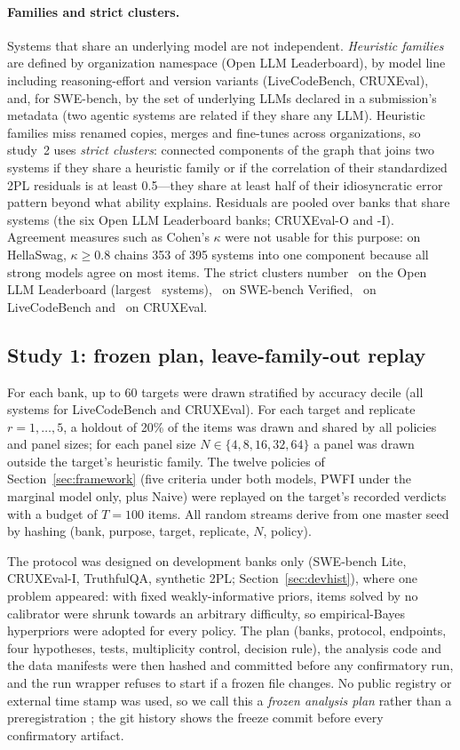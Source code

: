 \paragraph{Families and strict clusters.} Systems that share an underlying model are
not independent. \emph{Heuristic families} are defined by organization namespace (Open
LLM Leaderboard), by model line including reasoning-effort and version variants
(LiveCodeBench, CRUXEval), and, for SWE-bench, by the set of underlying LLMs declared in a
submission's metadata (two agentic systems are related if they share any LLM). Heuristic
families miss renamed copies, merges and fine-tunes across organizations, so study~2 uses
\emph{strict clusters}: connected components of the graph that joins two systems if they
share a heuristic family or if the correlation of their standardized 2PL residuals is at
least 0.5---they share at least half of their idiosyncratic error pattern beyond what
ability explains. Residuals are pooled over banks that share systems (the six Open LLM
Leaderboard banks; CRUXEval-O and -I). Agreement measures such as Cohen's $\kappa$ were
not usable for this purpose: on HellaSwag, $\kappa\ge0.8$ chains 353 of 395 systems into
one component because all strong models agree on most items. The strict clusters number
\ClusOLLB\ on the Open LLM Leaderboard (largest \ClusOLLBMax\ systems), \ClusSWE\ on
SWE-bench Verified, \ClusLCB\ on LiveCodeBench and \ClusCRUX\ on CRUXEval.

\subsection{Study 1: frozen plan, leave-family-out replay}\label{sec:dev}
For each bank, up to 60 targets were drawn stratified by accuracy decile (all systems
for LiveCodeBench and CRUXEval). For each target and replicate $r=1,\dots,5$, a holdout of
20\% of the items was drawn and shared by all policies and panel sizes; for each panel
size $N\in\{4,8,16,32,64\}$ a panel was drawn outside the target's heuristic family. The
twelve policies of Section~\ref{sec:framework} (five criteria under both models, PWFI
under the marginal model only, plus Naive) were replayed on the target's recorded
verdicts with a budget of $T=100$ items. All random streams derive from one master seed
by hashing (bank, purpose, target, replicate, $N$, policy).

The protocol was designed on development banks only (SWE-bench Lite, CRUXEval-I,
TruthfulQA, synthetic 2PL; Section~\ref{sec:devhist}), where one problem appeared: with
fixed weakly-informative priors, items solved by no calibrator were shrunk towards an
arbitrary difficulty, so empirical-Bayes hyperpriors were adopted for every policy. The
plan (banks, protocol, endpoints, four hypotheses, tests, multiplicity control, decision
rule), the analysis code and the data manifests were then hashed and committed before any
confirmatory run, and the run wrapper refuses to start if a frozen file changes. No public
registry or external time stamp was used, so we call this a \emph{frozen analysis plan}
rather than a preregistration \citep{nosek2018preregistration}; the git history shows the
freeze commit before every confirmatory artifact.

